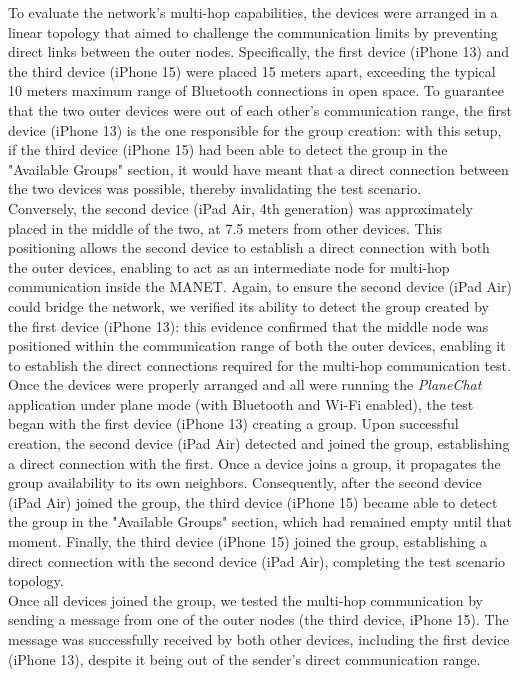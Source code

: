 \documentclass[conference]{IEEEtran}
\begin{document}
To evaluate the network's multi-hop capabilities, the devices were arranged 
in a linear topology that aimed to challenge the communication limits by
preventing direct links between the outer nodes. 
Specifically, the first device (iPhone 13) and the third device (iPhone 15) were
placed 15 meters apart, exceeding the typical 10 meters maximum range of Bluetooth
connections in open space. 
To guarantee that the two outer devices were out of each other's communication
range, the first device (iPhone 13) is the one responsible for the group
creation: with this setup, if the third device (iPhone 15) had been able to
detect the group in the "Available Groups" section, it would have meant that a
direct connection between the two devices was possible, thereby invalidating the
test scenario. \\ 
Conversely, the second device (iPad Air, 4th generation) was approximately
placed in the middle of the two, at 7.5 meters from other devices. This
positioning allows the second device to establish a direct connection with both
the outer devices, enabling to act as an intermediate node for multi-hop
communication inside the MANET. Again, to ensure the second device (iPad
Air) could bridge the network, we verified its ability to detect the group
created by the first device (iPhone 13): this evidence confirmed that the middle
node was positioned within the communication range of both the outer devices,
enabling it to establish the direct connections required for the multi-hop
communication test. \\

Once the devices were properly arranged and all were running the
\textit{PlaneChat} application under plane mode (with Bluetooth and Wi-Fi
enabled), the test began with the first device (iPhone 13) creating a group.
Upon successful creation, the second device (iPad Air) detected and joined the
group, establishing a direct connection with the first. Once a device joins a
group, it propagates the group availability to its own neighbors. Consequently,
after the second device (iPad Air) joined the group, the third device (iPhone
15) became able to detect the group in the "Available Groups" section, which had
remained empty until that moment. 
Finally, the third device (iPhone 15) joined the group, establishing a direct
connection with the second device (iPad Air), completing the test scenario
topology. \\

Once all devices joined the group, we tested the multi-hop communication by
sending a message from one of the outer nodes (the third device, iPhone 15). The
message was successfully received by both other devices, including the first
device (iPhone 13), despite it being out of the sender's direct communication
range. \\
\end{document}
